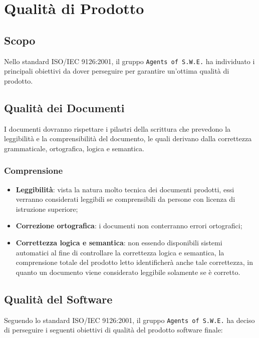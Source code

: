 \section{Qualità di Prodotto}
\label{qualitaProdotto}

\subsection{Scopo}

Nello standard ISO/IEC 9126:2001, il gruppo \texttt{Agents of S.W.E.} ha individuato i principali obiettivi da dover perseguire per garantire un'ottima qualità di prodotto.  

\subsection{Qualità dei Documenti}

I documenti dovranno rispettare i pilastri della scrittura che prevedono la leggibilità e la comprensibilità del documento, le quali derivano dalla correttezza grammaticale, ortografica, logica e semantica.

\subsubsection{Comprensione}

\begin{itemize}
	\item \textbf{Leggibilità}: vista la natura molto tecnica dei documenti prodotti, essi verranno considerati leggibili se comprensibili da persone con licenza di istruzione superiore;
	\item \textbf{Correzione ortografica}: i documenti non conterranno errori ortografici;
	\item \textbf{Correttezza logica e semantica}: non essendo disponibili sistemi automatici al fine di controllare 
la correttezza logica e semantica, la comprensione totale del prodotto letto identificherà anche tale correttezza, in quanto un documento viene considerato leggibile solamente se è corretto.
\end{itemize}

\subsection{Qualità del Software}

Seguendo lo standard ISO/IEC 9126:2001, il gruppo \texttt{Agents of S.W.E.} ha deciso di perseguire i seguenti obiettivi di qualità del prodotto software finale:

